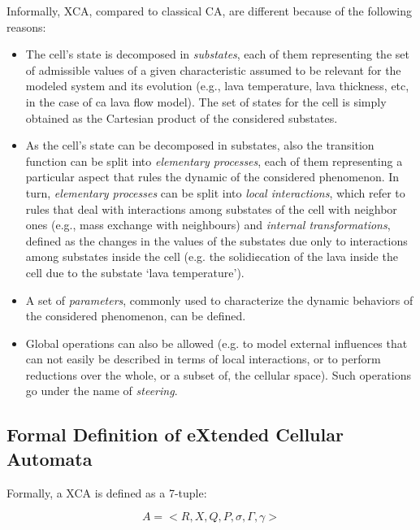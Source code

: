 Informally, XCA, compared to classical CA, are different because of
the following reasons:

\begin{itemize}

\item The cell's state is decomposed in \emph{substates}, each of them
  representing the set of admissible values of a given characteristic
  assumed to be relevant for the modeled system and its evolution
  (e.g., lava temperature, lava thickness, etc, in the case of ca lava
  flow model). The set of states for the cell is simply obtained as
  the Cartesian product of the considered substates.

\item As the cell's state can be decomposed in substates, also the
  transition function can be split into \emph{elementary processes},
  each of them representing a particular aspect that rules the dynamic
  of the considered phenomenon. In turn, \emph{elementary processes}
  can be split into \emph{local interactions}, which refer to rules
  that deal with interactions among substates of the cell with
  neighbor ones (e.g., mass exchange with neighbours) and
  \emph{internal transformations}, defined as the changes in the
  values of the substates due only to interactions among substates
  inside the cell (e.g. the solidi¢cation of the lava inside the cell
  due to the substate ‘lava temperature’).

\item A set of \emph{parameters}, commonly used to characterize the
  dynamic behaviors of the considered phenomenon, can be defined.

\item Global operations can also be allowed (e.g. to model external
  influences that can not easily be described in terms of local
  interactions, or to perform reductions over the whole, or a subset
  of, the cellular space). Such operations go under the name of
  \emph{steering}.

\end{itemize}


\subsection{Formal Definition of eXtended Cellular Automata}


Formally, a XCA is defined as a 7-tuple:

$$ A = <R,X,Q,P,\sigma,\Gamma,\gamma>$$

